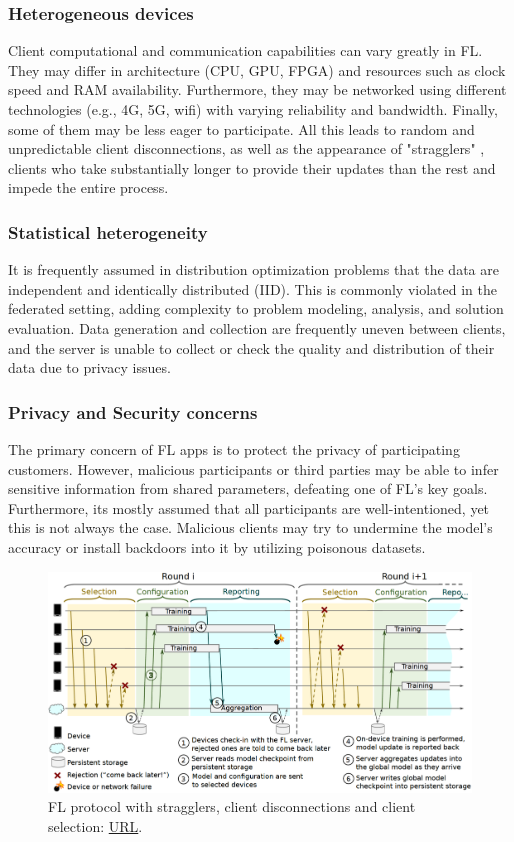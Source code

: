 \subsubsection{Heterogeneous devices} %
Client computational and communication capabilities can vary greatly in FL. They may differ in architecture (CPU, GPU, FPGA) and resources such as clock speed and RAM availability. Furthermore, they may be networked using different technologies (e.g., 4G, 5G, wifi) with varying reliability and bandwidth. Finally, some of them may be less eager to participate. All this leads to random and unpredictable client disconnections, as well as the appearance of "stragglers" \cite{stragglers}, clients who take substantially longer to provide their updates than the rest and impede the entire process.

\subsubsection{Statistical heterogeneity} %
It is frequently assumed in distribution optimization problems that the data are independent and identically distributed (IID). This is commonly violated in the federated setting, adding complexity to problem modeling, analysis, and solution evaluation. Data generation and collection are frequently uneven between clients, and the server is unable to collect or check the quality and distribution of their data due to privacy issues.

\subsubsection{Privacy and Security concerns} %
The primary concern of FL apps is to protect the privacy of participating customers. However, malicious participants or third parties may be able to infer sensitive information from shared parameters, defeating one of FL's key goals. Furthermore, its mostly assumed that all participants are well-intentioned, yet this is not always the case. Malicious clients may try to undermine the model's accuracy or install backdoors into it by utilizing poisonous datasets.
    
\begin{figure}[H]
    \centering
        \includegraphics[width=1\textwidth]{Images/fl_protocol.png}
        \decoRule
        \caption[FL protocol]{FL protocol with stragglers, client disconnections and client selection: \href{https://ieeexplore.ieee.org/document/9060868}{URL}.}
        \label{fig:FL protocol}
\end{figure}

